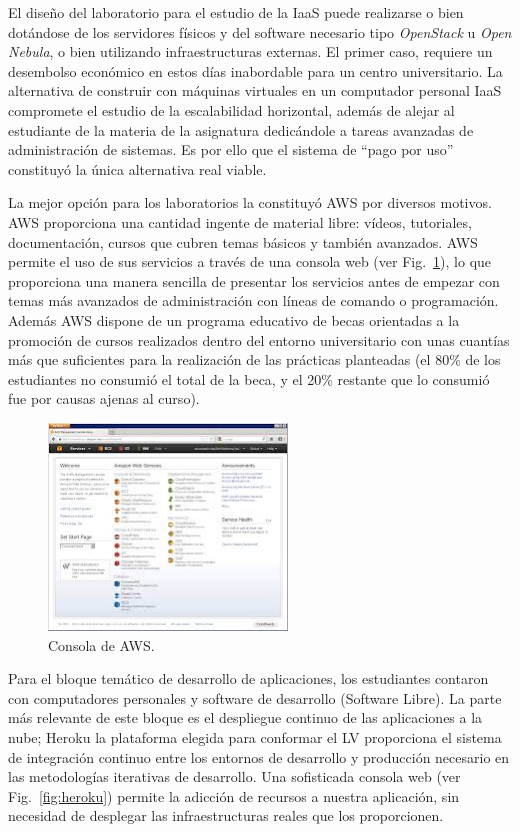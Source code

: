 \documentclass[conference]{IEEEtran}
\begin{document}
El diseño del laboratorio para el estudio de la IaaS  puede realizarse
o bien dotándose de los servidores físicos y del software necesario tipo \textit{OpenStack} \cite{Pepple:2011} u \textit{Open Nebula}, o bien utilizando infraestructuras externas.
El primer caso, requiere un desembolso económico en estos días inabordable para un centro universitario.
La alternativa de construir con máquinas virtuales en un computador personal IaaS compromete el estudio de la escalabilidad horizontal,
además de  alejar al estudiante de la materia de la asignatura dedicándole a tareas avanzadas de administración de sistemas.
Es por ello que el sistema de ``pago por uso'' constituyó la única alternativa real viable.

La mejor opción para los laboratorios la constituyó AWS por diversos motivos.
AWS proporciona una cantidad ingente de material libre: vídeos, tutoriales, documentación, cursos que cubren temas básicos y también avanzados.
AWS permite el uso de sus servicios a través de una consola web (ver Fig.~\ref{fig:console}), lo que proporciona una  manera sencilla de presentar
los servicios antes de empezar con temas más avanzados de administración con líneas de comando o programación.
Además AWS dispone de un programa educativo de becas orientadas a la promoción de cursos realizados dentro del entorno universitario con unas cuantías más que suficientes
para la realización de las prácticas planteadas (el 80\% de los estudiantes no consumió el total de la beca, y el 20\% restante que lo consumió fue por causas ajenas al curso).

\begin{figure}[!t]
\centering
\includegraphics[width=2.5in]{console.jpeg}
\caption{Consola de AWS.}
\label{fig:console}
\end{figure} 

Para el bloque temático de desarrollo de aplicaciones, los estudiantes contaron con computadores personales y software de desarrollo (Software Libre).
La parte más relevante de este bloque es el despliegue continuo de las aplicaciones a la nube; Heroku la plataforma elegida para conformar el LV proporciona
el sistema de integración continuo entre los entornos de desarrollo y producción necesario en las metodologías iterativas de desarrollo.
Una sofisticada consola web (ver Fig.~\ref{fig:heroku}) permite la adicción  de recursos a nuestra aplicación,
sin necesidad de desplegar las infraestructuras reales que los proporcionen.
\end{document}
